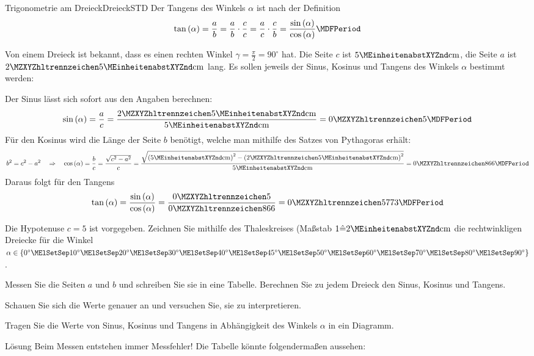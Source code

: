 \begin{MXContent}{Trigonometrie am Dreieck}{Dreieck}{STD}
Der Tangens des Winkels $\alpha$ ist nach der Definition \[\tan\left(\alpha\right)=\frac{a}{b}=\frac{a}{b}\cdot\frac{c}{c}=\frac{a}{c}\cdot\frac{c}{b}=\frac{\sin\left(\alpha\right)}{\cos\left(\alpha\right)} \MDFPeriod\]

\begin{MExample}
Von einem Dreieck ist bekannt, dass es einen rechten Winkel $\gamma=\frac{\pi}{2}=90^\circ$ hat. Die Seite $c$ ist $5\MEinheit{cm}$, die Seite $a$ ist $\MZahl{2}{5}\MEinheit{cm}$ lang. Es sollen jeweils der Sinus, Kosinus und Tangens des Winkels $\alpha$ bestimmt werden:

Der Sinus l\"asst sich sofort aus den Angaben berechnen:
\[\sin\left(\alpha\right)=\frac{a}{c}=\frac{\MZahl{2}{5}\MEinheit{cm}}{5\MEinheit{cm}}=\MZahl{0}{5} \MDFPeriod\]
F\"ur den Kosinus wird die L\"ange der Seite $b$ ben\"otigt, welche man mithilfe des Satzes von Pythagoras erh\"alt:
\[b^2=c^2-a^2\quad\Rightarrow\quad\cos\left(\alpha\right)=\frac{b}{c}=\frac{\sqrt{c^2-a^2}}{c}=\frac{\sqrt{\left(5\MEinheit{cm}\right)^2-\left(\MZahl{2}{5}\MEinheit{cm}\right)^2}}{5\MEinheit{cm}}=\MZahl{0}{866} \MDFPeriod\]
Daraus folgt f\"ur den Tangens
\[\tan\left(\alpha\right)=\frac{\sin\left(\alpha\right)}{\cos\left(\alpha\right)}=\frac{\MZahl{0}{5}}{\MZahl{0}{866}}=\MZahl{0}{5773} \MDFPeriod\]
\end{MExample}


\begin{MExercise}
Die Hypotenuse $c=5$ ist vorgegeben. Zeichnen Sie mithilfe des Thaleskreises (Ma\ss stab $ 1\hat{=}2\MEinheit{cm}$
die rechtwinkligen Dreiecke f\"ur die Winkel $\alpha\in\left\{0^\circ\MElSetSep 10^\circ\MElSetSep 20^\circ\MElSetSep 30^\circ\MElSetSep 40^\circ\MElSetSep 45^\circ\MElSetSep
50^\circ\MElSetSep 60^\circ\MElSetSep 70^\circ\MElSetSep 80^\circ\MElSetSep 90^\circ\right\}$.

Messen Sie die Seiten $a$ und $b$ und schreiben Sie sie in eine Tabelle. Berechnen Sie zu jedem Dreieck den Sinus, Kosinus und Tangens.

Schauen Sie sich die Werte genauer an und versuchen Sie, sie zu interpretieren.

Tragen Sie die Werte von Sinus, Kosinus und Tangens in Abh\"angigkeit des Winkels $\alpha$ in ein Diagramm.

\begin{MHint}{L\"osung}
Beim Messen entstehen immer Messfehler!
Die Tabelle k\"onnte folgenderma\ss en aussehen:


\end{MHint}
\end{MExercise}
\end{MXContent}
